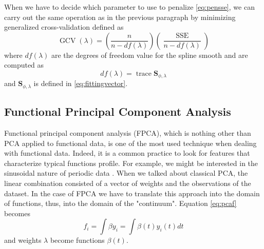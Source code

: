 When we have to decide which parameter to use to penalize \ref{eq:pensse}, we can carry out the same operation as in the previous paragraph by minimizing generalized cross-validation defined as
\begin{equation}
\label{eq:gcv}
    \operatorname{GCV}(\lambda)=\left(\frac{n}{n-d f(\lambda)}\right)\left(\frac{\operatorname{SSE}}{n-d f(\lambda)}\right)
\end{equation}
where $df(\lambda)$ are the degrees of freedom value for the spline smooth and are computed as
\begin{equation}
   df(\lambda)=\operatorname{trace} \mathbf{S}_{\phi, \lambda}
\end{equation}
and $\mathbf{S}_{\phi, \lambda}$ is defined in \ref{eq:fittingvector}.

\subsection{Functional Principal Component Analysis}
Functional principal component analysis (FPCA), which is nothing other than PCA applied to functional data, is one of the most used technique when dealing with functional data. Indeed, it is a common practice to look for features that characterize typical functions profile. For example, we might be interested in the sinusoidal nature of periodic data \cite{ramsay_functional_2006}. When we talked about classical PCA, the linear combination consisted of a vector of weights and the observations of the dataset. In the case of FPCA we have to translate this approach into the domain of functions, thus, into the domain of the "continuum". Equation \ref{eq:pcaf} becomes
\begin{equation}
    f_i= \int \beta y_i = \int \beta(t) y_i(t) dt
\end{equation}
and weights $\lambda$ become functions $\beta(t)$. 
